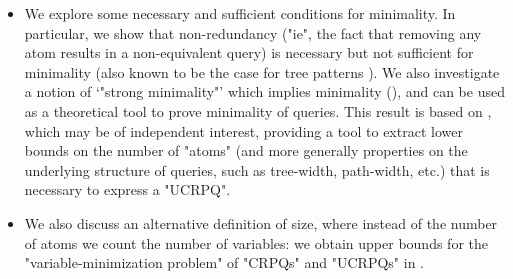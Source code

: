 \begin{itemize}
		"PiP2"-complete (). %
	\item We explore some necessary and sufficient conditions for minimality. In particular, we show that non-redundancy ("ie", the fact that removing any atom results in a non-equivalent query) is necessary but not sufficient for minimality (also known to be the case for tree patterns \cite{min-tree-patterns}). We also investigate a notion of `"strong minimality"' which implies minimality (), and can be used as a theoretical tool to prove minimality of queries.
	This result is based on , which may be of independent interest, providing a tool to extract
	lower bounds on the number of "atoms" (and more generally properties on the underlying structure of queries, such as tree-width, path-width, etc.) that is necessary to express a "UCRPQ".
	\item We also discuss an alternative definition of size, where instead of the number of atoms we count the number of variables: we obtain upper bounds for the "variable-minimization problem" of "CRPQs" and "UCRPQs" in .
\end{itemize}
	
